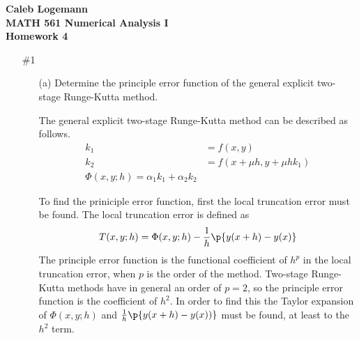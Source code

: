 \documentclass[11pt]{article}
\begin{document}
\noindent \textbf{\Large{Caleb Logemann \\
MATH 561 Numerical Analysis I \\
Homework 4
}}

\begin{enumerate}
    \item[\#1] %
        \begin{enumerate}
            \item[(a)]
                Determine the principle error function of the general explicit
                two-stage Runge-Kutta method.

                The general explicit two-stage Runge-Kutta method can be
                described as follows.
                \begin{align*}
                    k_1 &= f(x,y) \\
                    k_2 &= f(x + \mu h, y + \mu h k_1) \\
                    \Phi(x, y; h) = \alpha_1 k_1 + \alpha_2 k_2
                \end{align*}

                To find the priniciple error function, first the local
                truncation error must be found.
                The local truncation error is defined as
                \[
                    T(x, y; h) = \Phi(x, y; h) - \frac{1}{h}\p{y(x + h) - y(x)}
                \]
                The principle error function is the functional coefficient of $h^p$
                in the local truncation error, when $p$ is the order of the method.
                Two-stage Runge-Kutta methods have in general an order of $p = 2$,
                so the principle error function is the coefficient of $h^2$.
                In order to find this the Taylor expansion of $\Phi(x, y; h)$ and
                $\frac{1}{h}\p{y(x + h) - y(x))}$ must be found, at least to the 
                $h^2$ term.


\end{enumerate}
\end{enumerate}
\end{document}
